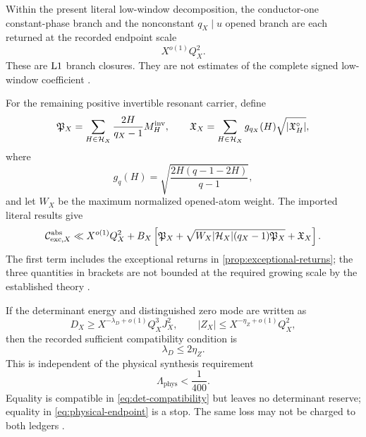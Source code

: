 \begin{proposition}
\label{prop:exceptional-returns}
Within the present literal low-window decomposition, the
conductor-one constant-phase branch and the nonconstant
\(q_X\mid u\) opened branch are each returned at the recorded
endpoint scale
\[
X^{o(1)}Q_X^2.
\]
These are \(\mathrm{L1}\) branch closures.  They are not estimates of the
complete signed low-window coefficient
\cite{WangTPC98,WangTPC100}.
\end{proposition}

\begin{theorem}
\label{thm:three-ledger}
For the remaining positive invertible resonant carrier, define
\[
\mathfrak P_X
=\sum_{H\in\mathcal H_X}\frac{2H}{q_X-1}M_H^{\mathrm{inv}},
\qquad
\mathfrak X_X
=\sum_{H\in\mathcal H_X}g_{q_X}(H)
\sqrt{|\mathfrak X_H^\circ|},
\]
where
\[
g_q(H)
=
\sqrt{\frac{2H(q-1-2H)}{q-1}},
\]
and let \(W_X\) be the maximum normalized opened-atom weight.  The
imported literal results give
\begin{equation}
\mathcal C_{\mathrm{exc},X}^{\mathrm{abs}}
\ll
X^{o(1)}Q_X^2
+B_X\left[
\mathfrak P_X+
\sqrt{W_X|\mathcal H_X|(q_X-1)\mathfrak P_X}
+\mathfrak X_X
\right].
\label{eq:three-ledger}
\end{equation}
The first term includes the exceptional returns in
\cref{prop:exceptional-returns}; the three quantities in brackets are
not bounded at the required growing scale by the established theory
\cite{WangTPC101,WangTPC102}.
\end{theorem}

\begin{proposition}
\label{prop:two-ledgers}
If the determinant energy and distinguished zero mode are written as
\[
D_X\ge
X^{-\lambda_D+o(1)}Q_X^3J_X^2,
\qquad
|Z_X|\le X^{-\eta_Z+o(1)}Q_X^2,
\]
then the recorded sufficient compatibility condition is
\begin{equation}
\lambda_D\le 2\eta_Z.
\label{eq:det-compatibility}
\end{equation}
This is independent of the physical synthesis requirement
\begin{equation}
\Lambda_{\mathrm{phys}}<\frac1{400}.
\label{eq:physical-endpoint}
\end{equation}
Equality is compatible in \eqref{eq:det-compatibility} but leaves no
determinant reserve; equality in \eqref{eq:physical-endpoint} is a
stop.  The same loss may not be charged to both ledgers
\cite{WangTPC81,WangTPC82,WangTPC92}.
\end{proposition}

